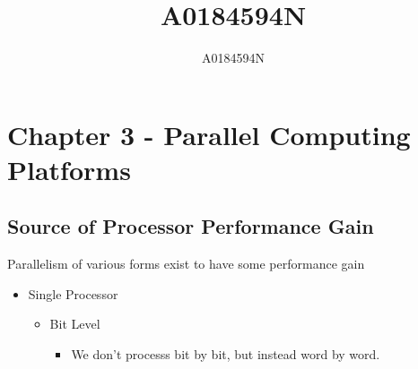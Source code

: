 \documentclass{article}
\title{A0184594N}
\author{A0184594N}
\begin{document}
\section{Chapter 3 - Parallel Computing Platforms}

\subsection{Source of Processor Performance Gain}
Parallelism of various forms exist to have some performance gain
\begin{itemize}
    \item Single Processor
          \begin{itemize}
              \item Bit Level
                    \begin{itemize}
                        \item We don't processs bit by bit, but instead word by word.
                    \end{itemize}


\end{itemize}
\end{itemize}
\end{document}
